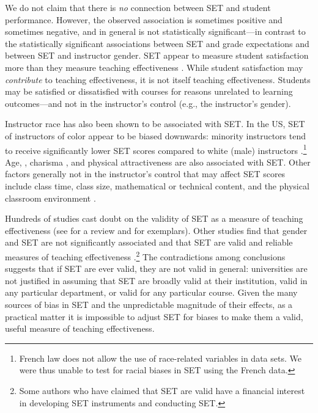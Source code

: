 \documentclass[12pt]{article}
\begin{document}
We do not claim that there is \emph{no} connection between SET and student
performance.
However, the observed association is sometimes positive and sometimes
negative, and in general is not statistically significant---in contrast to
the statistically significant associations between SET and grade expectations and 
between SET and instructor gender.
SET appear to measure student satisfaction more than they measure teaching 
effectiveness \citep{StarkFreishtat2014}. 
While student satisfaction may \emph{contribute} to teaching effectiveness, it is not 
itself teaching effectiveness.
Students may be satisfied or dissatisfied with courses for reasons unrelated to 
learning outcomes---and not in the instructor's control (e.g., the instructor's gender).

Instructor race has also been shown to be associated with SET.
In the US, SET of instructors of color appear to be biased downwards:
minority instructors tend to receive significantly lower SET scores compared to white (male) 
instructors \citep{Merritt2008}.\footnote{%
  French law does not allow the use of race-related variables in data sets. 
  We were thus unable to test for racial biases in SET using the French data.
} 
Age, \citep{Arbuckle2003}, 
charisma \citep{Shevlin2000}, and 
physical attractiveness \citep{Riniolo2006,Hamermesh2005} 
are also associated with SET.
Other factors generally not in the instructor's control that may affect SET scores include
class time, class size, mathematical or technical content, and the 
physical classroom environment \citep{Hill2010}.

Hundreds of studies cast doubt on the validity of SET as a measure of teaching effectiveness 
(see \citet{Pounder2007} for a review and \citet{Galbraith2012,Carrell2010a} for exemplars). 
Other studies find that gender and SET are not significantly associated \citep{Bennett1982,Centra2000,Elmore1974} and that SET are valid and reliable measures of teaching effectiveness \citep{Benton2012,Centra1977}.\footnote{%
  Some authors who have claimed that SET are valid have a financial interest in 
  developing SET instruments and conducting SET.
} 
The contradictions among conclusions suggests that if SET are ever valid, they
are not valid in general: universities are not justified in assuming that SET are broadly valid at their
institution, valid in any particular department, or valid for any particular course. 
Given the many sources of bias in 
SET and the unpredictable magnitude of their effects, as a practical matter it is impossible to adjust
SET for biases to make them a valid, useful measure of teaching effectiveness. 
\end{document}
